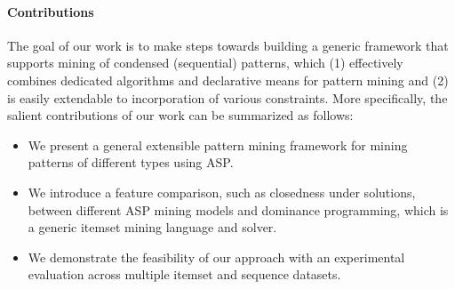 \paragraph{Contributions} The goal of our work is to make steps towards building a generic framework that supports  mining of condensed (sequential) patterns, which (1) effectively combines dedicated algorithms and declarative means for pattern mining and (2) is easily extendable to incorporation of various constraints. More specifically, the salient contributions of our work can be summarized as follows:

\begin{itemize}
  \item  We present a general extensible pattern mining framework for mining patterns of different types using ASP.
  \item  We introduce a feature comparison, such as closedness under solutions, between different ASP mining models and dominance programming, which is a generic itemset mining language and solver.
  \item  We demonstrate the feasibility of our approach with an experimental evaluation across multiple itemset and sequence datasets.
\end{itemize}


